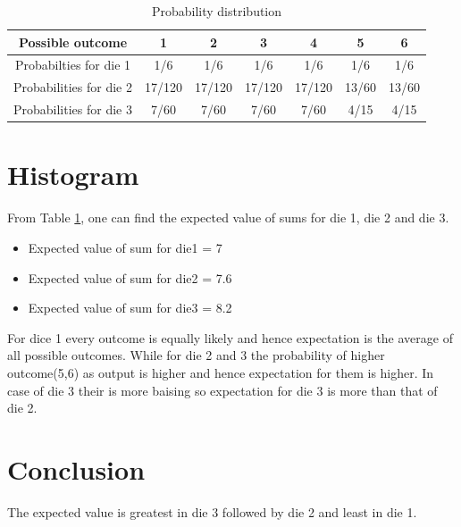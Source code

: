 \documentclass{article}
\begin{document}
\begin{table}[h]
    \centering
    \begin{tabular}{||c|c|c|c|c|c|c||}
\hline 
Possible outcome & 1 & 2 & 3 & 4 & 5 & 6 \\
\hline
Probabilties for die 1 & 1/6 & 1/6 & 1/6 & 1/6 & 1/6 & 1/6 \\
\hline
Probabilities for die 2 & 17/120 & 17/120 & 17/120 & 17/120 & 13/60 & 13/60 \\
\hline
Probabilities for die 3 & 7/60 & 7/60 & 7/60 & 7/60 & 4/15 & 4/15 \\
\hline
     \end{tabular}
     \caption{Probability distribution}
     \label{table:two}
\end{table}


\section{Histogram}
From Table \ref{table:two}, one can find the expected value of sums for die 1, die 2 and die 3.\\

\begin{itemize}
\item Expected value of sum for die1 = 7
\item Expected value of sum for die2 = 7.6
\item Expected value of sum for die3 = 8.2
\end{itemize}

For dice 1 every outcome is equally likely and hence expectation is the average of all possible outcomes.
While for die 2 and 3 the probability of higher outcome(5,6) as output is higher and hence expectation for them is higher.
In case of die 3 their is more baising so expectation for die 3 is more than that of die 2.

\section{Conclusion}
The expected value is greatest in die 3 followed by die 2 and least in die 1.

\newpage
{}
\printindex
\end{document}
